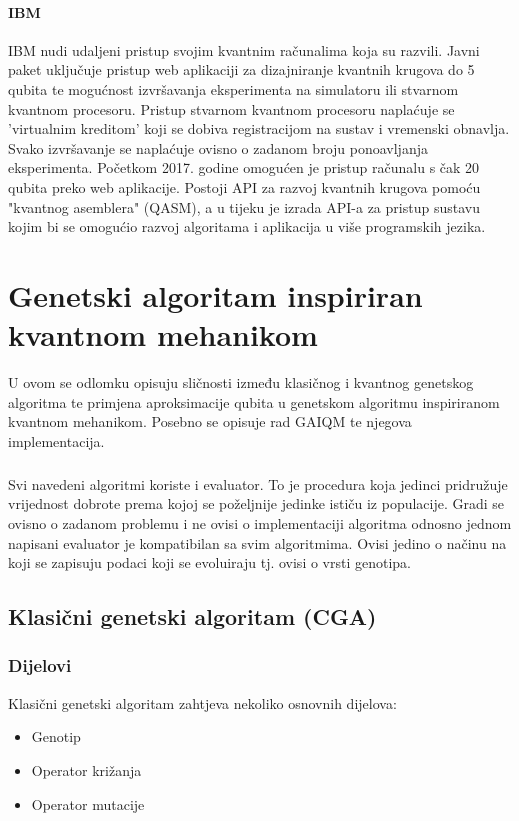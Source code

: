 \documentclass[times, utf8, zavrsni, numeric]{fer}
\begin{document}
\subsubsection{IBM}
IBM nudi udaljeni pristup svojim kvantnim računalima koja su razvili. Javni paket uključuje pristup web aplikaciji za dizajniranje kvantnih krugova do 5 qubita te mogućnost izvršavanja eksperimenta na simulatoru ili stvarnom kvantnom procesoru. Pristup stvarnom kvantnom procesoru naplaćuje se 'virtualnim kreditom' koji se dobiva registracijom na sustav i vremenski obnavlja. Svako izvršavanje se naplaćuje ovisno o zadanom broju ponoavljanja eksperimenta. Početkom 2017. godine omogućen je pristup računalu s čak 20 qubita preko web aplikacije. Postoji API za razvoj kvantnih krugova pomoću "kvantnog asemblera" (QASM), a u tijeku je izrada API-a za pristup sustavu kojim bi se omogućio razvoj algoritama i aplikacija u više programskih jezika.

\chapter{Genetski algoritam inspiriran kvantnom mehanikom} 
\label{ch:gaiqm}
U ovom se odlomku opisuju sličnosti između klasičnog i kvantnog genetskog algoritma te primjena aproksimacije qubita u genetskom algoritmu inspiriranom kvantnom mehanikom. Posebno se opisuje rad GAIQM te njegova implementacija.

\paragraph{}
Svi navedeni algoritmi koriste i evaluator.
To je procedura koja jedinci pridružuje vrijednost dobrote  prema kojoj se poželjnije jedinke ističu iz populacije. Gradi se ovisno o zadanom problemu i ne ovisi o implementaciji algoritma odnosno jednom napisani evaluator je kompatibilan sa svim algoritmima. Ovisi jedino o načinu na koji se zapisuju podaci koji se evoluiraju tj. ovisi o vrsti genotipa.

\section{Klasični genetski algoritam (CGA)}
\subsection{Dijelovi}
Klasični genetski algoritam zahtjeva nekoliko osnovnih dijelova:
\begin{itemize}
\item Genotip 
\item Operator križanja 
\item Operator mutacije
\end{itemize}
\end{document}
